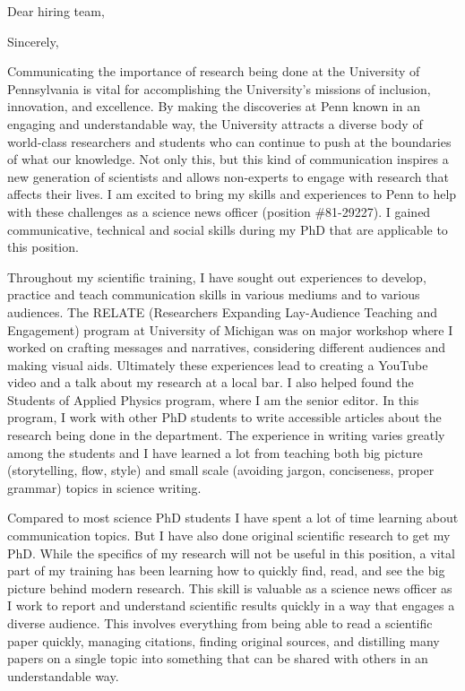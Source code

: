 \thispagestyle{empty}

\date{August 9, 2018}
\opening{Dear hiring team,}
\closing{Sincerely,}
\makelettertitle

Communicating the importance of research being done at the University of Pennsylvania is vital for accomplishing the University's missions of inclusion, innovation, and excellence. By making the discoveries at Penn known in an engaging and understandable way, the University attracts a diverse body of world-class researchers and students who can continue to push at the boundaries of what our knowledge. Not only this, but this kind of communication inspires a new generation of scientists and allows non-experts to engage with research that affects their lives. I am excited to bring my skills and experiences to Penn to help with these challenges as a science news officer (position \#81-29227). I gained communicative, technical and social skills during my PhD that are applicable to this position.

Throughout my scientific training, I have sought out experiences to develop, practice and teach communication skills in various mediums and to various audiences. The RELATE (Researchers Expanding Lay-Audience Teaching and Engagement) program at University of Michigan was on major workshop where I worked on crafting messages and narratives, considering different audiences and making visual aids. Ultimately these experiences lead to creating a YouTube video and a talk about my research at a local bar. I also helped found the Students of Applied Physics program, where I am the senior editor. In this program, I work with other PhD students to write accessible articles about the research being done in the department. The experience in writing varies greatly among the students and I have learned a lot from teaching both big picture (storytelling, flow, style) and small scale (avoiding jargon, conciseness, proper grammar) topics in science writing.

Compared to most science PhD students I have spent a lot of time learning about communication topics. But I have also done original scientific research to get my PhD. While the specifics of my research will not be useful in this position, a vital part of my training has been learning how to quickly find, read, and see the big picture behind modern research. This skill is valuable as a science news officer as I work to report and understand scientific results quickly in a way that engages a diverse audience. This involves everything from being able to read a scientific paper quickly, managing citations, finding original sources, and distilling many papers on a single topic into something that can be shared with others in an understandable way. 

